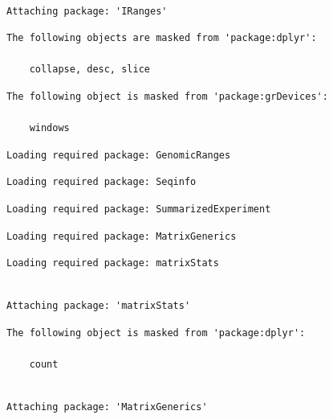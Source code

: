 \documentclass[
  letterpaper,
  DIV=11,
  numbers=noendperiod]{scrartcl}
\begin{document}
\begin{verbatim}

Attaching package: 'IRanges'
\end{verbatim}

\begin{verbatim}
The following objects are masked from 'package:dplyr':

    collapse, desc, slice
\end{verbatim}

\begin{verbatim}
The following object is masked from 'package:grDevices':

    windows
\end{verbatim}

\begin{verbatim}
Loading required package: GenomicRanges
\end{verbatim}

\begin{verbatim}
Loading required package: Seqinfo
\end{verbatim}

\begin{verbatim}
Loading required package: SummarizedExperiment
\end{verbatim}

\begin{verbatim}
Loading required package: MatrixGenerics
\end{verbatim}

\begin{verbatim}
Loading required package: matrixStats
\end{verbatim}

\begin{verbatim}

Attaching package: 'matrixStats'
\end{verbatim}

\begin{verbatim}
The following object is masked from 'package:dplyr':

    count
\end{verbatim}

\begin{verbatim}

Attaching package: 'MatrixGenerics'
\end{verbatim}
\end{document}
